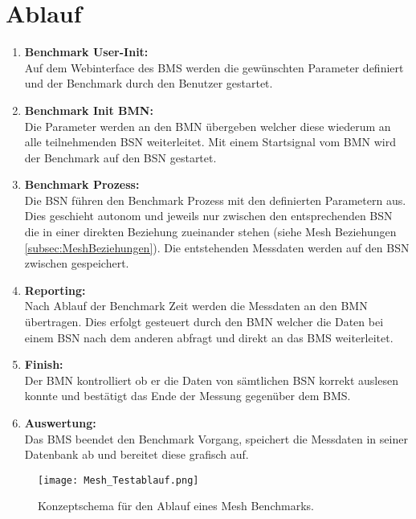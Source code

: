 	\clearpage
\section{Ablauf}\label{sec:Ablauf}


\begin{enumerate}
	\item \textbf{Benchmark User-Init:}\\
	Auf dem Webinterface des BMS werden die gewünschten Parameter definiert und der Benchmark durch den Benutzer gestartet.
	\item \textbf{Benchmark Init BMN:}\\
	Die Parameter werden an den BMN übergeben welcher diese wiederum an alle teilnehmenden BSN weiterleitet. Mit einem Startsignal vom BMN wird der Benchmark auf den BSN gestartet.
	\item \textbf{Benchmark Prozess:}\\
	Die BSN führen den Benchmark Prozess mit den definierten Parametern aus. Dies geschieht autonom und jeweils nur zwischen den entsprechenden BSN die in einer direkten Beziehung zueinander stehen (siehe Mesh Beziehungen \ref{subsec:MeshBeziehungen}). Die entstehenden Messdaten werden auf den BSN zwischen gespeichert.
	\item \textbf{Reporting:}\\
	Nach Ablauf der Benchmark Zeit werden die Messdaten an den BMN übertragen. Dies erfolgt gesteuert durch den BMN welcher die Daten bei einem BSN nach dem anderen abfragt und direkt an das BMS weiterleitet.
	\item \textbf{Finish:}\\
	Der BMN kontrolliert ob er die Daten von sämtlichen BSN korrekt auslesen konnte und bestätigt das Ende der Messung gegenüber dem BMS.
	\item \textbf{Auswertung:}\\
	Das BMS beendet den Benchmark Vorgang, speichert die Messdaten in seiner Datenbank ab und bereitet diese grafisch auf. 
\end{enumerate}


\begin{figure}[H]
	\centering
	\texttt{[image: Mesh\_Testablauf.png]}
	\caption{Konzeptschema für den Ablauf eines Mesh Benchmarks.}\label{fig:MeshTestkablauf}
\end{figure}





